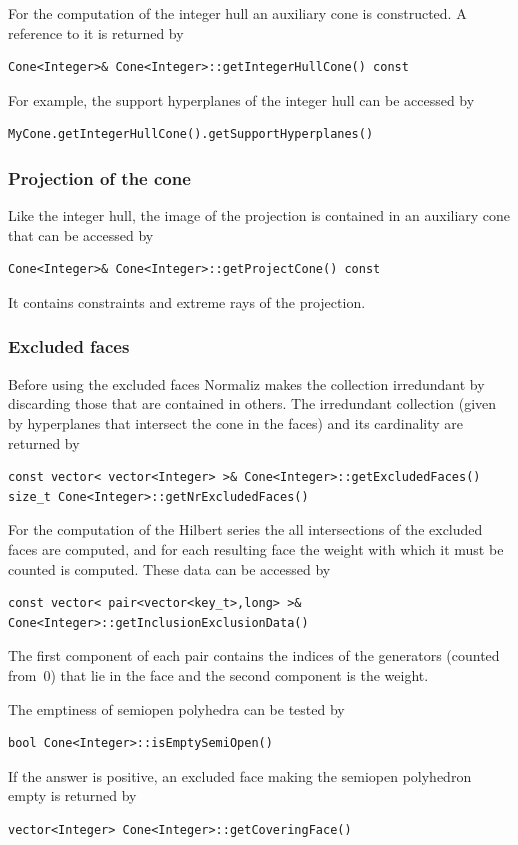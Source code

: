\begin{small}
For the computation of the integer hull an auxiliary cone is constructed. A reference to it is returned by
\begin{Verbatim}
Cone<Integer>& Cone<Integer>::getIntegerHullCone() const
\end{Verbatim}

For example, the support hyperplanes of the integer hull can be accessed by
\begin{Verbatim}
MyCone.getIntegerHullCone().getSupportHyperplanes()
\end{Verbatim}

\subsubsection{Projection of the cone}

Like the integer hull, the image of the projection is contained in an auxiliary cone that can be accessed by
\begin{Verbatim}
Cone<Integer>& Cone<Integer>::getProjectCone() const
\end{Verbatim}

It contains constraints and extreme rays of the projection.

\subsubsection{Excluded faces}

Before using the excluded faces Normaliz makes the collection irredundant by discarding those that are contained in others. The irredundant collection (given by hyperplanes that intersect the cone in the faces) and its cardinality are returned by
\begin{Verbatim}
const vector< vector<Integer> >& Cone<Integer>::getExcludedFaces()
size_t Cone<Integer>::getNrExcludedFaces()
\end{Verbatim}
For the computation of the Hilbert series the all intersections of the excluded faces are computed, and for each resulting face the weight with which it must be counted is computed. These data can be accessed by
\begin{Verbatim}
const vector< pair<vector<key_t>,long> >& Cone<Integer>::getInclusionExclusionData()
\end{Verbatim}
The first component of each pair contains the indices of the generators (counted from~$0$) that lie in the face and the second component is the weight.

The emptiness of semiopen polyhedra can be tested by
\begin{Verbatim}
bool Cone<Integer>::isEmptySemiOpen()
\end{Verbatim}
If the answer is positive, an excluded face making the semiopen polyhedron empty is returned by
\begin{Verbatim}
vector<Integer> Cone<Integer>::getCoveringFace() 
\end{Verbatim}


\end{small}
